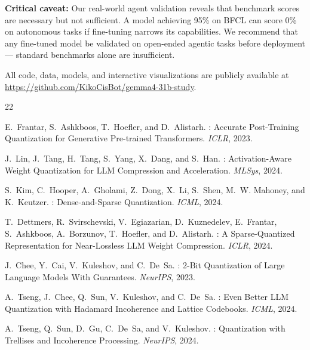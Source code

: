\documentclass[11pt,a4paper]{article}
\begin{document}
\textbf{Critical caveat:} Our real-world agent validation reveals that benchmark scores are necessary but not sufficient. A model achieving 95\% on BFCL can score 0\% on autonomous tasks if fine-tuning narrows its capabilities. We recommend that any fine-tuned model be validated on open-ended agentic tasks before deployment --- standard benchmarks alone are insufficient.

All code, data, models, and interactive visualizations are publicly available at \url{https://github.com/KikoCisBot/gemma4-31b-study}.


\begin{thebibliography}{22}

E.~Frantar, S.~Ashkboos, T.~Hoefler, and D.~Alistarh.
: Accurate Post-Training Quantization for Generative Pre-trained Transformers.
\newblock \emph{ICLR}, 2023.

J.~Lin, J.~Tang, H.~Tang, S.~Yang, X.~Dang, and S.~Han.
: Activation-Aware Weight Quantization for {LLM} Compression and Acceleration.
\newblock \emph{MLSys}, 2024.

S.~Kim, C.~Hooper, A.~Gholami, Z.~Dong, X.~Li, S.~Shen, M.~W. Mahoney, and K.~Keutzer.
: Dense-and-Sparse Quantization.
\newblock \emph{ICML}, 2024.

T.~Dettmers, R.~Svirschevski, V.~Egiazarian, D.~Kuznedelev, E.~Frantar, S.~Ashkboos, A.~Borzunov, T.~Hoefler, and D.~Alistarh.
: A Sparse-Quantized Representation for Near-Lossless {LLM} Weight Compression.
\newblock \emph{ICLR}, 2024.

J.~Chee, Y.~Cai, V.~Kuleshov, and C.~De~Sa.
: 2-Bit Quantization of Large Language Models With Guarantees.
\newblock \emph{NeurIPS}, 2023.

A.~Tseng, J.~Chee, Q.~Sun, V.~Kuleshov, and C.~De~Sa.
: Even Better {LLM} Quantization with Hadamard Incoherence and Lattice Codebooks.
\newblock \emph{ICML}, 2024.

A.~Tseng, Q.~Sun, D.~Gu, C.~De~Sa, and V.~Kuleshov.
: Quantization with Trellises and Incoherence Processing.
\newblock \emph{NeurIPS}, 2024.


\end{thebibliography}
\end{document}
